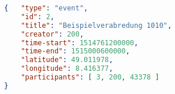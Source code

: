 \documentclass[aspectratio=0510]{beamer}
\begin{document}
    \newcommand*\circled[1]{\tikz[baseline=(char.base)]{
    \node[shape=circle,draw,inner sep=1pt] (char) {\scriptsize #1};}}
    \begin{lstlisting}[language=json,firstnumber=1]
{   "type": "event",
    "id": 2,
    "title": "Beispielverabredung 1010",
    "creator": 200,
    "time-start": 1514761200000,
    "time-end": 1515000600000,
    "latitude": 49.011978,
    "longitude": 8.416377,
    "participants": [ 3, 200, 43378 ]
}
    \end{lstlisting}
\end{document}
